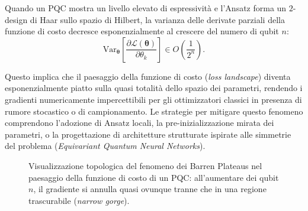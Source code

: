 Quando un PQC mostra un livello elevato di espressività e l'Ansatz forma un $2$-design di Haar sullo spazio di Hilbert, la varianza delle derivate parziali della funzione di costo decresce esponenzialmente al crescere del numero di qubit $n$:
\begin{equation}
\text{Var}_{\boldsymbol{\theta}} \left[ \frac{\partial \mathcal{L}(\boldsymbol{\theta})}{\partial \theta_k} \right] \in O\left( \frac{1}{2^n} \right).
\end{equation}

Questo implica che il paesaggio della funzione di costo (\textit{loss landscape}) diventa esponenzialmente piatto sulla quasi totalità dello spazio dei parametri, rendendo i gradienti numericamente impercettibili per gli ottimizzatori classici in presenza di rumore stocastico o di campionamento. Le strategie per mitigare questo fenomeno comprendono l'adozione di Ansatz locali, la pre-inizializzazione mirata dei parametri, o la progettazione di architetture strutturate ispirate alle simmetrie del problema (\textit{Equivariant Quantum Neural Networks}).

\begin{figure}[htbp]
    \centering
    \caption{\footnotesize Visualizzazione topologica del fenomeno dei Barren Plateaus nel paesaggio della funzione di costo di un PQC: all'aumentare dei qubit $n$, il gradiente si annulla quasi ovunque tranne che in una regione trascurabile (\textit{narrow gorge}).}
    \label{fig:barren_plateaus}
\end{figure}

